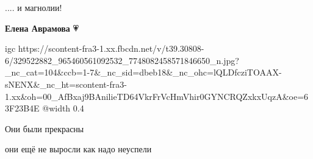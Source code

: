  
 
 
 
 

\qqSecCmt


.... и магнолии!

\textbf{Елена Аврамова} 💗


\ifcmt
  igc https://scontent-fra3-1.xx.fbcdn.net/v/t39.30808-6/329522882_965460561092532_7748082458571846650_n.jpg?_nc_cat=104&ccb=1-7&_nc_sid=dbeb18&_nc_ohc=lQLDfcziTOAAX-sNENX&_nc_ht=scontent-fra3-1.xx&oh=00_AfBxaj9BAnilieTD64VkrFrVcHmVhir0GYNCRQZxkxUqzA&oe=63F23B4E
	@width 0.4
\fi


Они были прекрасны 💞


они ещё не выросли как надо неуспели
